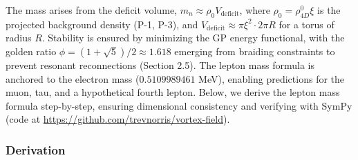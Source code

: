 The mass arises from the deficit volume, $m_n \approx \rho_0 V_{\text{deficit}}$, where $\rho_0 = \rho_{4D}^0 \xi$ is the projected background density (P-1, P-3), and $V_{\text{deficit}} \approx \pi \xi^2 \cdot 2\pi R$ for a torus of radius $R$. Stability is ensured by minimizing the GP energy functional, with the golden ratio $\phi = (1 + \sqrt{5})/2 \approx 1.618$ emerging from braiding constraints to prevent resonant reconnections (Section 2.5). The lepton mass formula is anchored to the electron mass ($0.5109989461$ MeV), enabling predictions for the muon, tau, and a hypothetical fourth lepton. Below, we derive the lepton mass formula step-by-step, ensuring dimensional consistency and verifying with SymPy (code at \url{https://github.com/trevnorris/vortex-field}).

\subsubsection{Derivation}
